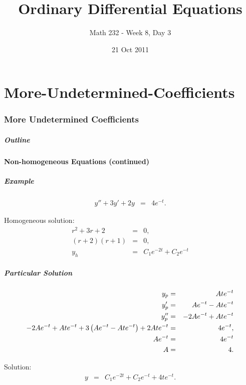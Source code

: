 \part{More-Undetermined-Coefficients}
\section{More Undetermined Coefficients}

\title{Ordinary Differential Equations}
\subtitle{Math 232 - Week 8, Day 3}
\date{21 Oct 2011}

\begin{frame}
  \titlepage
\end{frame}

\begin{frame}
  \frametitle{Outline}
\end{frame}


\subsection{Non-homogeneous Equations (continued)}


\begin{frame}
  \frametitle{Example}

  \begin{eqnarray*}
    y'' + 3y' + 2y & = & 4 e^{-t}.
  \end{eqnarray*}

  {
    Homogeneous solution:
    \begin{eqnarray*}
      r^2 + 3r + 2 & = & 0, \\
      (r+2)(r+1) & = & 0, \\
      y_h & = & C_1 e^{-2t} + C_2 e^{-t}
    \end{eqnarray*}
  }

\end{frame}

\begin{frame}
  \frametitle{Particular Solution}

  \begin{eqnarray*}
    y_p & = & A t e^{-t} \\
    y_p' & = & A e^{-t} - Ate^{-t} \\
    y_p'' & = & -2A e^{-t} + At e^{-t} \\
    -2A e^{-t} + At e^{-t} + 3 \left( A e^{-t} - Ate^{-t} \right) 
    + 2 A t e^{-t} & = & 4 e^{-t}, \\
    A e^{-t} & = & 4 e^{-t} \\
    A & = & 4.
  \end{eqnarray*}

  Solution:
  \begin{eqnarray*}
    y & = & C_1 e^{-2t} + C_2 e^{-t} + 4 t e^{-t}.
  \end{eqnarray*}

\end{frame}


